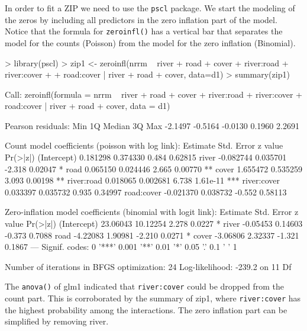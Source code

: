 \documentclass{article}
\begin{document}
In order to fit a ZIP we need to use the \verb!pscl! package. We start the modeling of the zeros by including all predictors in the zero inflation part of the model. Notice that the formula for \verb!zeroinfl()! has a vertical bar that separates the model for the counts (Poisson) from the model for the zero inflation (Binomial).
\begin{Schunk}
\begin{Sinput}
> library(pscl)
> zip1 <- zeroinfl(nrrm ~ river + road + cover + river:road + river:cover +
+                    road:cover | river + road + cover, data=d1)
> summary(zip1)
\end{Sinput}
\begin{Soutput}
Call:
zeroinfl(formula = nrrm ~ river + road + cover + river:road + river:cover + 
    road:cover | river + road + cover, data = d1)

Pearson residuals:
    Min      1Q  Median      3Q     Max 
-2.1497 -0.5164 -0.0130  0.1960  2.2691 

Count model coefficients (poisson with log link):
             Estimate Std. Error z value Pr(>|z|)    
(Intercept)  0.181298   0.374330   0.484  0.62815    
river       -0.082744   0.035701  -2.318  0.02047 *  
road         0.065150   0.024446   2.665  0.00770 ** 
cover        1.655472   0.535259   3.093  0.00198 ** 
river:road   0.018065   0.002681   6.738 1.61e-11 ***
river:cover  0.033397   0.035732   0.935  0.34997    
road:cover  -0.021370   0.038732  -0.552  0.58113    

Zero-inflation model coefficients (binomial with logit link):
            Estimate Std. Error z value Pr(>|z|)  
(Intercept) 23.06043   10.12254   2.278   0.0227 *
river       -0.05453    0.14603  -0.373   0.7088  
road        -4.22083    1.90981  -2.210   0.0271 *
cover       -3.06806    2.32337  -1.321   0.1867  
---
Signif. codes:  0 '***' 0.001 '**' 0.01 '*' 0.05 '.' 0.1 ' ' 1 

Number of iterations in BFGS optimization: 24 
Log-likelihood: -239.2 on 11 Df
\end{Soutput}
\end{Schunk}

The \verb!anova()! of glm1 indicated that \verb!river:cover! could be dropped from the count part. This is corroborated by the summary of zip1, where \verb!river:cover! has the highest probability among the interactions. The zero inflation part can be simplified by removing river.
\end{document}
